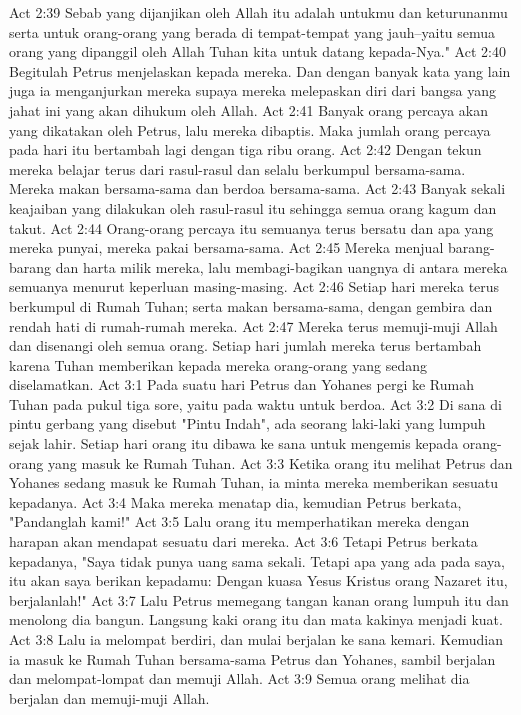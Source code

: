 Act 2:39  Sebab yang dijanjikan oleh Allah itu adalah untukmu dan keturunanmu serta untuk orang-orang yang berada di tempat-tempat yang jauh--yaitu semua orang yang dipanggil oleh Allah Tuhan kita untuk datang kepada-Nya."
Act 2:40  Begitulah Petrus menjelaskan kepada mereka. Dan dengan banyak kata yang lain juga ia menganjurkan mereka supaya mereka melepaskan diri dari bangsa yang jahat ini yang akan dihukum oleh Allah.
Act 2:41  Banyak orang percaya akan yang dikatakan oleh Petrus, lalu mereka dibaptis. Maka jumlah orang percaya pada hari itu bertambah lagi dengan tiga ribu orang.
Act 2:42  Dengan tekun mereka belajar terus dari rasul-rasul dan selalu berkumpul bersama-sama. Mereka makan bersama-sama dan berdoa bersama-sama.
Act 2:43  Banyak sekali keajaiban yang dilakukan oleh rasul-rasul itu sehingga semua orang kagum dan takut.
Act 2:44  Orang-orang percaya itu semuanya terus bersatu dan apa yang mereka punyai, mereka pakai bersama-sama.
Act 2:45  Mereka menjual barang-barang dan harta milik mereka, lalu membagi-bagikan uangnya di antara mereka semuanya menurut keperluan masing-masing.
Act 2:46  Setiap hari mereka terus berkumpul di Rumah Tuhan; serta makan bersama-sama, dengan gembira dan rendah hati di rumah-rumah mereka.
Act 2:47  Mereka terus memuji-muji Allah dan disenangi oleh semua orang. Setiap hari jumlah mereka terus bertambah karena Tuhan memberikan kepada mereka orang-orang yang sedang diselamatkan.
Act 3:1  Pada suatu hari Petrus dan Yohanes pergi ke Rumah Tuhan pada pukul tiga sore, yaitu pada waktu untuk berdoa.
Act 3:2  Di sana di pintu gerbang yang disebut "Pintu Indah", ada seorang laki-laki yang lumpuh sejak lahir. Setiap hari orang itu dibawa ke sana untuk mengemis kepada orang-orang yang masuk ke Rumah Tuhan.
Act 3:3  Ketika orang itu melihat Petrus dan Yohanes sedang masuk ke Rumah Tuhan, ia minta mereka memberikan sesuatu kepadanya.
Act 3:4  Maka mereka menatap dia, kemudian Petrus berkata, "Pandanglah kami!"
Act 3:5  Lalu orang itu memperhatikan mereka dengan harapan akan mendapat sesuatu dari mereka.
Act 3:6  Tetapi Petrus berkata kepadanya, "Saya tidak punya uang sama sekali. Tetapi apa yang ada pada saya, itu akan saya berikan kepadamu: Dengan kuasa Yesus Kristus orang Nazaret itu, berjalanlah!"
Act 3:7  Lalu Petrus memegang tangan kanan orang lumpuh itu dan menolong dia bangun. Langsung kaki orang itu dan mata kakinya menjadi kuat.
Act 3:8  Lalu ia melompat berdiri, dan mulai berjalan ke sana kemari. Kemudian ia masuk ke Rumah Tuhan bersama-sama Petrus dan Yohanes, sambil berjalan dan melompat-lompat dan memuji Allah.
Act 3:9  Semua orang melihat dia berjalan dan memuji-muji Allah.
